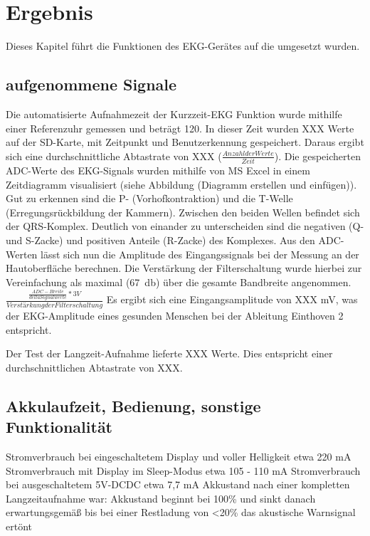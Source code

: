 
\section{Ergebnis}

Dieses Kapitel führt die Funktionen des EKG-Gerätes auf die umgesetzt wurden. 

\subsection{aufgenommene Signale}

Die automatisierte Aufnahmezeit der Kurzzeit-EKG Funktion wurde mithilfe einer Referenzuhr gemessen und beträgt \SI{120}{\sec}. In dieser Zeit wurden XXX Werte auf der SD-Karte, mit Zeitpunkt und Benutzerkennung gespeichert. Daraus ergibt sich eine durchschnittliche Abtastrate von XXX ($ \frac{Anzahl der Werte}{Zeit}$). Die gespeicherten ADC-Werte des EKG-Signals wurden mithilfe von MS Excel in einem Zeitdiagramm visualisiert (siehe Abbildung (Diagramm erstellen und einfügen)). Gut zu erkennen sind die P- (Vorhofkontraktion) und die T-Welle (Erregungsrückbildung der Kammern). Zwischen den beiden Wellen befindet sich der QRS-Komplex. Deutlich von einander zu unterscheiden sind die negativen (Q- und S-Zacke) und positiven Anteile (R-Zacke) des Komplexes. Aus den ADC-Werten lässt sich nun die Amplitude des Eingangssignals bei der Messung an der Hautoberfläche berechnen. Die Verstärkung der Filterschaltung wurde hierbei zur Vereinfachung als maximal (\SI{67}{\decibel}) über die gesamte Bandbreite angenommen. 
$  \frac{\frac{ADC-Breite}{delta Signalwerte} * 3V}{Verstärkung der Filterschaltung} $
Es ergibt sich eine Eingangsamplitude von XXX mV, was der EKG-Amplitude eines gesunden Menschen bei der Ableitung Einthoven 2 entspricht.

Der Test der Langzeit-Aufnahme lieferte XXX Werte. Dies entspricht einer durchschnittlichen Abtastrate von XXX. 



\subsection{Akkulaufzeit, Bedienung, sonstige Funktionalität}

Stromverbrauch bei eingeschaltetem Display und voller Helligkeit etwa 220 mA
Stromverbrauch mit Display im Sleep-Modus etwa 105 - 110 mA
Stromverbrauch bei ausgeschaltetem 5V-DCDC etwa 7,7 mA
Akkustand nach einer kompletten Langzeitaufnahme war: 
Akkustand beginnt bei 100\% und sinkt danach erwartungsgemäß bis bei einer Restladung von <20\% das akustische Warnsignal ertönt